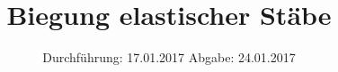 

\subject{V. 103}
\title{Biegung elastischer Stäbe}
\date{
	\centering
	Durchführung: 17.01.2017
	\hspace{3em}
	Abgabe: 24.01.2017
}



\maketitle
\thispagestyle{empty}
\tableofcontents
\newpage








\printbibliography


